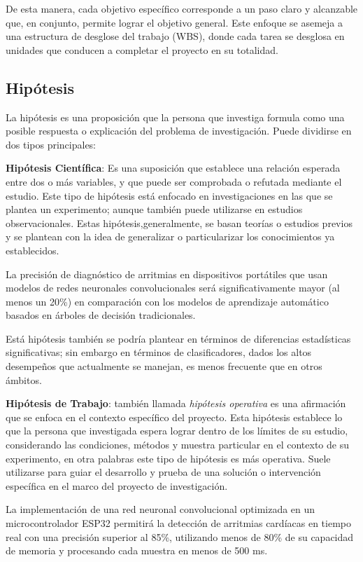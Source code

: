 \documentclass[12pt,letterpaper,spanish, twoside]{article}
\begin{document}
De esta manera, cada objetivo específico corresponde a un paso claro y alcanzable que, en conjunto, permite lograr el objetivo general. Este enfoque se asemeja a una estructura de desglose del trabajo (WBS), donde cada tarea se desglosa en unidades que conducen a completar el proyecto en su totalidad.
 
\subsection{Hipótesis}
La hipótesis es una proposición que la persona que investiga formula como una posible respuesta o explicación del problema de investigación. Puede dividirse en dos tipos principales:

\textbf{Hipótesis Científica}: Es una suposición que establece una relación esperada entre dos o más variables, y que puede ser comprobada o refutada mediante el estudio. Este tipo de hipótesis está enfocado en investigaciones en las que se plantea un experimento; aunque también puede utilizarse en estudios observacionales. Estas hipótesis,generalmente, se basan teorías o estudios previos y se plantean con la idea de generalizar o particularizar los conocimientos ya establecidos.

\ej La precisión de diagnóstico de arritmias en dispositivos portátiles que usan modelos de redes neuronales convolucionales será significativamente mayor (al menos un 20\%) en comparación con los modelos de aprendizaje automático basados en árboles de decisión tradicionales.

Está hipótesis también se podría plantear en términos de diferencias estadísticas significativas; sin embargo en términos de clasificadores, dados los altos desempeños que actualmente se manejan, es menos frecuente que en otros ámbitos.

\textbf{Hipótesis de Trabajo}: también llamada \textit{hipótesis operativa} es una afirmación que se enfoca en el contexto específico del proyecto. Esta hipótesis establece lo que la persona que investigada espera lograr dentro de los límites de su estudio, considerando las condiciones, métodos y muestra particular en el contexto de su experimento, en otra palabras este tipo de hipótesis es más operativa. Suele utilizarse para guiar el desarrollo y prueba de una solución o intervención específica en el marco del proyecto de investigación.

\ej La implementación de una red neuronal convolucional optimizada en un microcontrolador ESP32 permitirá la detección de arritmias cardíacas en tiempo real con una precisión superior al 85\%, utilizando menos de 80\% de su capacidad de memoria y procesando cada muestra en menos de 500 ms.
\end{document}
